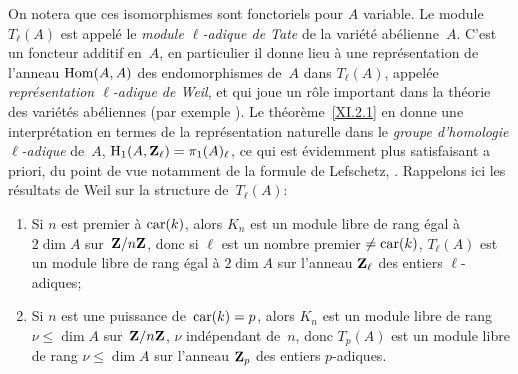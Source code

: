 On notera que ces isomorphismes sont fonctoriels pour $A$ variable. Le
module $T_\ell(A)$ est appel\'e le \emph{module $\ell$-adique de
Tate} de la vari\'et\'e ab\'elienne~$A$. C'est un foncteur
additif en~$A$, en particulier il donne lieu \`a une
repr\'esentation de l'anneau $\operatorname{Hom}(A,A)$ des endomorphismes de~$A$
dans $T_\ell(A)$, appel\'ee \emph{représentation $\ell$-adique
de Weil}, et qui joue un r\^ole important dans la th\'eorie des
vari\'et\'es ab\'eliennes (\cf par exemple \hbox{\cite[chap~VII]{XI.4}}). Le
th\'eor\`eme~\ref{XI.2.1} en donne une interpr\'etation en
termes de la repr\'esentation naturelle dans le \emph{groupe
d'homologie $\ell$-adique} de~$A$, $\mathrm{H}_1(A,\mathbf{Z}_\ell)=\pi_1(A)_\ell$,
ce
qui est \'evidemment plus satisfaisant a priori, du point de vue
notamment de la formule de Lefschetz, \cite[Chap~V]{XI.4}. Rappelons ici les
r\'esultats de Weil sur la structure de~$T_\ell(A)$:
\begin{enumerate}
\item[a)] Si $n$ est premier \`a $\operatorname{car}(k)$, alors $K_n$ est un module
libre de rang \'egal \`a $2\dim A$ sur~$\mathbf{Z}/n\mathbf{Z}$, donc si $\ell$
est un nombre premier $\neq \operatorname{car}(k)$, $T_\ell(A)$ est un module libre
de rang \'egal \`a $2\dim A$ sur l'anneau $\mathbf{Z}_\ell$ des entiers
$\ell$-adiques;
\item[b)] Si $n$ est une puissance de~$\operatorname{car}(k)=p$, alors $K_n$ est un
module libre de rang $\nu\leq\dim A$ sur~$\mathbf{Z}/n\mathbf{Z}$, $\nu$
ind\'ependant de~$n$, donc $T_p(A)$ est un module libre de rang
$\nu\leq \dim A$ sur l'anneau $\mathbf{Z}_p$ des entiers $p$-adiques.
\end{enumerate}


